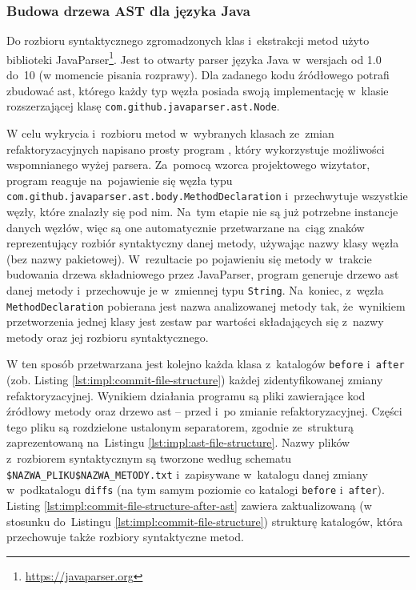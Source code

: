 \documentclass[twoside]{praca}
\begin{document}
\subsubsection{Budowa drzewa AST dla języka Java}
\label{impl:ast:javaparser}

Do rozbioru syntaktycznego zgromadzonych klas i~ekstrakcji metod użyto biblioteki JavaParser\footnote{\url{https://javaparser.org}}. Jest to otwarty parser języka Java w~wersjach od 1.0 do~10 (w momencie pisania rozprawy). Dla zadanego kodu źródłowego potrafi zbudować \gls{ast}, którego każdy typ węzła posiada swoją implementację w~klasie rozszerzającej klasę \texttt{com.github.javaparser.ast.Node}.

W celu wykrycia i~rozbioru metod w~wybranych klasach ze~zmian refaktoryzacyjnych napisano prosty program \cite{fracz:refactor-extractor}, który wykorzystuje możliwości wspomnianego wyżej parsera. Za~pomocą wzorca projektowego wizytator, program reaguje na~pojawienie się węzła typu \texttt{com.\-github.\-javaparser.\-ast.\-body.\-MethodDeclaration} i~przechwytuje wszystkie węzły, które znalazły się pod nim. Na~tym etapie nie są już potrzebne instancje danych węzłów, więc są one automatycznie przetwarzane na~ciąg znaków reprezentujący rozbiór syntaktyczny danej metody, używając nazwy klasy węzła (bez nazwy pakietowej). W~rezultacie po pojawieniu się metody w~trakcie budowania drzewa składniowego przez JavaParser, program generuje drzewo \gls{ast} danej metody i~przechowuje je w~zmiennej typu \texttt{String}. Na~koniec, z~węzła \texttt{MethodDeclaration} pobierana jest nazwa analizowanej metody tak, że~wynikiem przetworzenia jednej klasy jest zestaw par wartości składających się z~nazwy metody oraz jej rozbioru syntaktycznego.

W ten sposób przetwarzana jest kolejno każda klasa z~katalogów \texttt{before} i~\texttt{after} (zob. Listing \ref{lst:impl:commit-file-structure}) każdej zidentyfikowanej zmiany refaktoryzacyjnej. Wynikiem działania programu są pliki zawierające kod źródłowy metody oraz drzewo \gls{ast} -- przed i~po zmianie refaktoryzacyjnej. Części tego pliku są rozdzielone ustalonym separatorem, zgodnie ze~strukturą zaprezentowaną na~Listingu \ref{lst:impl:ast-file-structure}. Nazwy plików z~rozbiorem syntaktycznym są tworzone według schematu \texttt{\$NAZWA\_PLIKU\$NAZWA\_METODY.txt} i~zapisywane w~katalogu danej zmiany w~podkatalogu \texttt{diffs} (na tym samym poziomie co katalogi \texttt{before} i~\texttt{after}). Listing \ref{lst:impl:commit-file-structure-after-ast} zawiera zaktualizowaną (w stosunku do~Listingu \ref{lst:impl:commit-file-structure}) strukturę katalogów, która przechowuje także rozbiory syntaktyczne metod.
\end{document}
